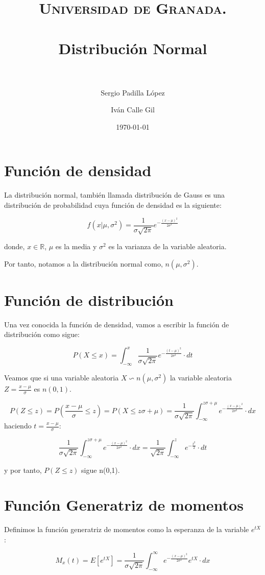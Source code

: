 \documentclass[paper=a4, fontsize=11pt, spanish]{scrartcl}
\title{
  \normalfont \normalsize
  \textsc{Universidad de Granada.} \\ [25pt]
  \horrule{0.5pt} \\[0.4cm]
  \huge Distribución Normal \\
  \horrule{2pt} \\[0.5cm]
}
\author{Sergio Padilla López \and Iván Calle Gil\\}
\date{\normalsize\today}
\begin{document}
\maketitle
\tableofcontents

\newpage

\section{Función de densidad}
La distribución normal, también llamada distribución de Gauss es una distribución de probabilidad cuya función de densidad es la siguiente:

$$ f(x|\mu,\sigma^2)=\frac{1}{\sigma\sqrt{2\pi}}e^{-\frac{(x-\mu)^2}{2\sigma^2}}   $$

donde, $x \in \mathds{R}$, $\mu$ es la media y $\sigma^2$ es la varianza de la variable aleatoria.

Por tanto, notamos a la distribución normal como, $n(\mu,\sigma^2)$.

\section{Función de distribución}
Una vez conocida la función de densidad, vamos a escribir la función de distribución como sigue:

$$
P(X \leq x) = \int_{-\infty}^{x} \frac{1}{\sigma\sqrt{2\pi}}e^{-\frac{(t-\mu)^2}{2\sigma^2}} \cdot dt
$$

Veamos que si una variable aleatoria $X \backsim n(\mu,\sigma^2)$ la variable aleatoria $Z=\frac{x-\mu}{\sigma}$ es $n(0,1)$.

$$
P(Z \leq z) = P(\frac{x-\mu}{\sigma} \leq z) = P(X \leq z\sigma + \mu) = \frac{1}{\sigma\sqrt{2\pi}} \int_{-\infty}^{z\sigma + \mu} e^{-\frac{(x-\mu)^2}{2\sigma^2}} \cdot dx
$$
haciendo $t=\frac{x-\mu}{\sigma}$:

$$
\frac{1}{\sigma\sqrt{2\pi}} \int_{-\infty}^{z\sigma + \mu} e^{-\frac{(x-\mu)^2}{2\sigma^2}} \cdot dx = \frac{1}{\sqrt{2\pi}} \int_{-\infty}^{z} e^{-\frac{t^2}{2}} \cdot dt
$$

y por tanto, $P(Z\leq z)$ sigue n(0,1).

\section{Función Generatriz de momentos}
Definimos la función generatriz de momentos como la esperanza de la variable $e^{tX}$:

$$ M_x(t) = E[e^{tX}] = \frac{1}{\sigma \sqrt{2\pi}} \int_{-\infty}^{\infty} e^{-\frac{(x-\mu)^2}{2\sigma^2}}e^{tX} \cdot dx $$
\end{document}
